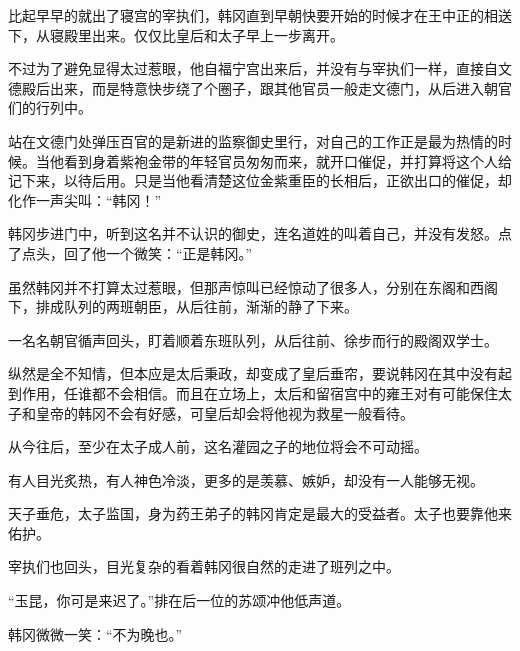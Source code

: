比起早早的就出了寝宫的宰执们，韩冈直到早朝快要开始的时候才在王中正的相送下，从寝殿里出来。仅仅比皇后和太子早上一步离开。

不过为了避免显得太过惹眼，他自福宁宫出来后，并没有与宰执们一样，直接自文德殿后出来，而是特意快步绕了个圈子，跟其他官员一般走文德门，从后进入朝官们的行列中。

站在文德门处弹压百官的是新进的监察御史里行，对自己的工作正是最为热情的时候。当他看到身着紫袍金带的年轻官员匆匆而来，就开口催促，并打算将这个人给记下来，以待后用。只是当他看清楚这位金紫重臣的长相后，正欲出口的催促，却化作一声尖叫：“韩冈！”

韩冈步进门中，听到这名并不认识的御史，连名道姓的叫着自己，并没有发怒。点了点头，回了他一个微笑：“正是韩冈。”

虽然韩冈并不打算太过惹眼，但那声惊叫已经惊动了很多人，分别在东阁和西阁下，排成队列的两班朝臣，从后往前，渐渐的静了下来。

一名名朝官循声回头，盯着顺着东班队列，从后往前、徐步而行的殿阁双学士。

纵然是全不知情，但本应是太后秉政，却变成了皇后垂帘，要说韩冈在其中没有起到作用，任谁都不会相信。而且在立场上，太后和留宿宫中的雍王对有可能保住太子和皇帝的韩冈不会有好感，可皇后却会将他视为救星一般看待。

从今往后，至少在太子成人前，这名灌园之子的地位将会不可动摇。

有人目光炙热，有人神色冷淡，更多的是羡慕、嫉妒，却没有一人能够无视。

天子垂危，太子监国，身为药王弟子的韩冈肯定是最大的受益者。太子也要靠他来佑护。

宰执们也回头，目光复杂的看着韩冈很自然的走进了班列之中。

“玉昆，你可是来迟了。”排在后一位的苏颂冲他低声道。

韩冈微微一笑：“不为晚也。”

